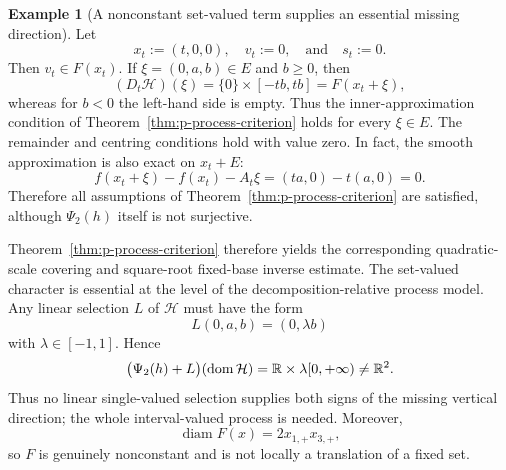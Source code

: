 \documentclass[11pt]{amsart}
\theoremstyle{definition}
\newtheorem{example}[theorem]{Example}
\theoremstyle{remark}
\newcommand{\domm}{\mathop{\rm dom}\nolimits}
\begin{document}
\begin{example}[A nonconstant set-valued term supplies an essential
		missing direction]
		Let
		$$
		x_t:=(t,0,0),\quad v_t:=0,\quad\text{and}\quad s_t:=0.
		$$
		Then $v_t\in F(x_t)$. If $\xi=(0,a,b)\in E$ and $b\ge0$, then
		$$
		(D_t\mathcal H)(\xi)
		=
		\{0\}\times[-tb,tb]
		=F(x_t+\xi),
		$$
		whereas for $b<0$ the left-hand side is empty. Thus the
		inner-approximation condition of
		Theorem~\ref{thm:p-process-criterion} holds for every $\xi\in E$.
		The remainder and centring conditions hold with value zero. In fact,
		the smooth approximation is also exact on $x_t+E$:
		$$
		f(x_t+\xi)-f(x_t)-A_t\xi
		=(ta,0)-t(a,0)=0.
		$$
		Therefore all assumptions of
		Theorem~\ref{thm:p-process-criterion} are satisfied, although
		$\Psi_2(h)$ itself is not surjective.
		
		Theorem~\ref{thm:p-process-criterion} therefore yields the corresponding
		quadratic-scale covering and square-root fixed-base inverse estimate.
		The set-valued character is essential at the level of the
		decomposition-relative process model. Any linear selection $L$ of
		$\mathcal H$ must have the form
		$$
		L(0,a,b)=(0,\lambda b)
		$$
		with $\lambda\in[-1,1]$. Hence
		$$
		\bigl(\Psi_2(h)+L\bigr)(\domm\mathcal H)
		=
		\mathbb R\times\lambda[0,+\infty)
		\ne\mathbb R^2.
		$$
		Thus no linear single-valued selection supplies both signs of the
		missing vertical direction; the whole interval-valued process is needed.
		Moreover,
		$$
		\operatorname{diam}F(x)=2x_{1,+}x_{3,+},
		$$
		so $F$ is genuinely nonconstant and is not locally a translation of a
		fixed set.
	\end{example}
	
\end{document}
